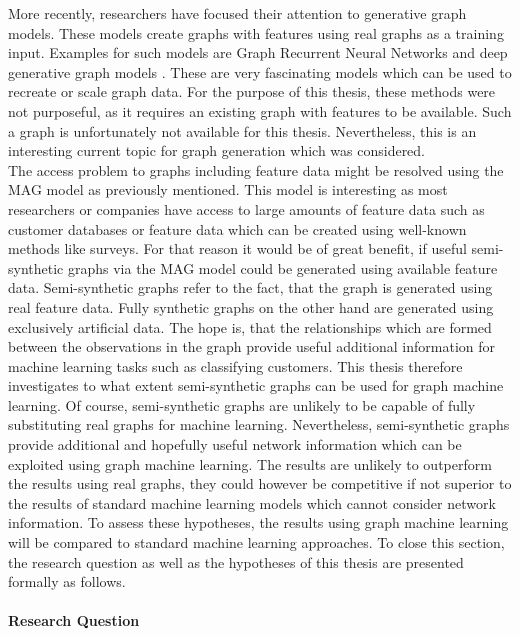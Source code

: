 	\noindent More recently, researchers have focused their attention to
	generative graph models. These models create graphs with features using
	real graphs as a training input. Examples for such models are Graph
	Recurrent Neural Networks \citep{you2018graphrnn} and deep generative graph
	models \citep{li2018learning}. These are very fascinating models which can
	be used to recreate or scale graph data. For the purpose of this thesis,
	these methods were not purposeful, as it requires an existing graph with
	features to be available. Such a graph is unfortunately not available for
	this thesis. Nevertheless, this is an interesting current topic for graph 
	generation which was considered. \\ 

	\noindent The access problem to graphs including feature data might be resolved
	using the MAG model as previously mentioned. This model is interesting as 
	most researchers or companies have access to large amounts of feature data 
	such as customer databases or feature data which can be created using 
	well-known methods like surveys. For that reason it would be of great
	benefit, if useful semi-synthetic graphs via the MAG model could be
	generated using available feature data. Semi-synthetic graphs refer to the 
	fact, that the graph is generated using real feature data. Fully synthetic 
	graphs on the other hand are generated using exclusively artificial data. 
	The hope is, that the relationships which are formed between the 
	observations in the graph provide useful additional information for machine 
	learning tasks such as classifying customers. This thesis therefore
	investigates to what extent semi-synthetic graphs can be used for graph
	machine learning. Of course, semi-synthetic graphs are unlikely to be
	capable of fully substituting real graphs for machine learning.
	Nevertheless, semi-synthetic graphs provide additional and hopefully useful
	network information which can be exploited using graph machine learning.
	The results are unlikely to outperform the results using real graphs, they
	could however be competitive if not superior to the results of standard 
	machine learning models which cannot consider network information. To assess 
	these hypotheses, the results using graph machine learning will be 
	compared to standard machine learning approaches. To close this section, 
	the research question as well as the hypotheses of this thesis are 
	presented formally as follows. 

	\paragraph{Research Question}\mbox{}

